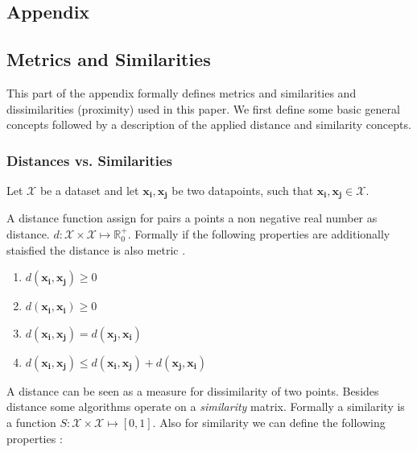 \documentclass[12pt,a4paper,bibliography=totocnumbered,listof=totocnumbered]{scrartcl}
\begin{document}
\begin{appendix}
	
\section*{Appendix}
{}

\subsection*{Metrics and Similarities}

This part of the appendix formally defines metrics and similarities and dissimilarities (proximity) used in this paper. We first define some basic general concepts followed by a description of the applied distance and similarity concepts. 

\subsubsection*{Distances vs. Similarities}

Let $\mathcal{X}$ be a dataset and let $\boldsymbol{x_i},\boldsymbol{x_j}$ be two datapoints, such that $\boldsymbol{x_i},\boldsymbol{x_j} \in \mathcal{X}$. 

A distance function assign for pairs a points a non negative real number as distance. $d:\mathcal{X}\times \mathcal{X} \mapsto \mathbb{R}_0^+$. Formally if the following properties are additionally staisfied the distance is also metric \cite[page 28]{Shirali06a}.

\begin{enumerate}
	\setlength{\itemsep}{-5pt}
	\item $d(\boldsymbol{x_i},\boldsymbol{x_j}) \ge 0$
	\item $d(\boldsymbol{x_i},\boldsymbol{x_i}) \ge 0$
	\item $d(\boldsymbol{x_i},\boldsymbol{x_j}) = d(\boldsymbol{x_j},\boldsymbol{x_i}) $
	\item $d(\boldsymbol{x_i},\boldsymbol{x_j}) \le d(\boldsymbol{x_i},\boldsymbol{x_j})+ d(\boldsymbol{x_j},\boldsymbol{x_i}) $
\end{enumerate}

A distance can be seen as a measure for dissimilarity of two points. Besides distance some algorithms operate on a \textit{similarity} matrix. Formally a similarity is a function  $ S : \mathcal{X} \times \mathcal{X} \mapsto [0,1] $. Also for similarity we can define the following properties \cite[page 3]{Fratev1979}:


\end{appendix}
\end{document}
